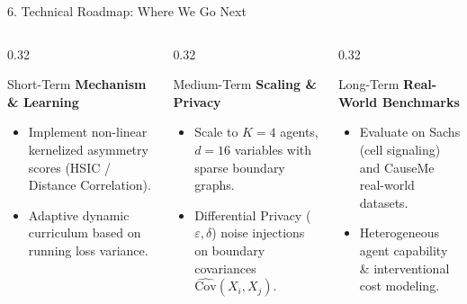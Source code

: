 \documentclass[aspectratio=169, 10pt]{beamer}
\begin{document}
\begin{frame}{6. Technical Roadmap: Where We Go Next}
  \begin{columns}[T]
    \begin{column}{0.32\textwidth}
      \begin{block}{Short-Term}
        \textbf{Mechanism & Learning}
        \begin{itemize}
          \item Implement non-linear kernelized asymmetry scores (HSIC / Distance Correlation).
          \item Adaptive dynamic curriculum based on running loss variance.
        \end{itemize}
      \end{block}
    \end{column}

    \begin{column}{0.32\textwidth}
      \begin{block}{Medium-Term}
        \textbf{Scaling \& Privacy}
        \begin{itemize}
          \item Scale to $K=4$ agents, $d=16$ variables with sparse boundary graphs.
          \item Differential Privacy ($\varepsilon, \delta$) noise injections on boundary covariances $\widehat{\text{Cov}}(X_i, X_j)$.
        \end{itemize}
      \end{block}
    \end{column}

    \begin{column}{0.32\textwidth}
      \begin{block}{Long-Term}
        \textbf{Real-World Benchmarks}
        \begin{itemize}
          \item Evaluate on Sachs (cell signaling) and CauseMe real-world datasets.
          \item Heterogeneous agent capability & interventional cost modeling.
        \end{itemize}
      \end{block}
    \end{column}
  \end{columns}
\end{frame}
\end{document}

